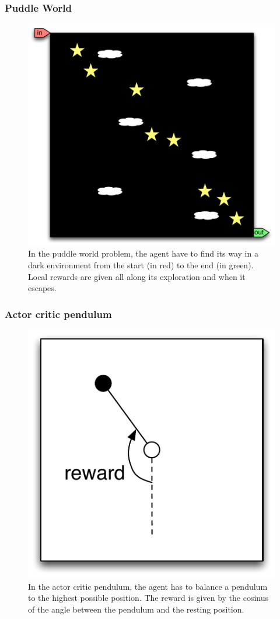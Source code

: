 \subsubsection{Puddle World}
\begin{figure}
\center
\includegraphics[width=0.75\linewidth]{PW_problem.pdf}
\caption{In the puddle world problem, the agent have to find its way in a dark environment from the start (in red) to the end (in green). Local rewards are given all along its exploration and when it escapes.}\label{fig:MC:problem}
\end{figure}

\subsubsection{Actor critic pendulum}
\begin{figure}
\center
\includegraphics[width=0.5\linewidth]{ACP_problem.pdf}
\caption{In the actor critic pendulum, the agent has to balance a pendulum to the highest possible position. The reward is given by the cosinus of the angle between the pendulum and the resting position.}\label{fig:MC:problem}
\end{figure}


